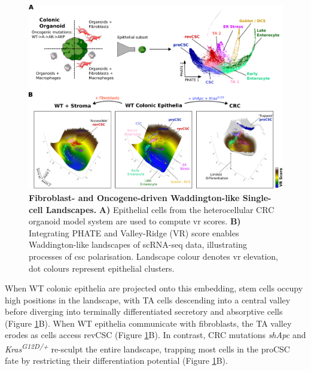 \begin{figure}[h]
    \centering
    \includegraphics{05vr/figs/5VR_landscape.png}
    \caption{\textbf{Fibroblast- and Oncogene-driven Waddington-like Single-cell Landscapes.} \textbf{A)} Epithelial cells from the heterocellular CRC organoid model system are used to compute \acrshort{vr} scores. \textbf{B)} Integrating PHATE and Valley-Ridge (VR) score enables Waddington-like landscapes of scRNA-seq data, illustrating processes of \acrshort{csc} polarisation. Landscape colour denotes \acrshort{vr} elevation, dot colours represent epithelial clusters.}
    \label{fig:5land}
\end{figure}

When WT colonic epithelia are projected onto this embedding, stem cells occupy high positions in the landscape, with TA cells descending into a central valley before diverging into terminally differentiated secretory and absorptive cells (Figure \ref{fig:5land}B). When WT epithelia communicate with fibroblasts, the TA valley erodes as cells access revCSC (Figure \ref{fig:5land}B). In contrast, CRC mutations \textit{shApc} and \textit{Kras\textsuperscript{G12D/+}} re-sculpt the entire landscape, trapping most cells in the proCSC fate by restricting their differentiation potential (Figure \ref{fig:5land}B). 


